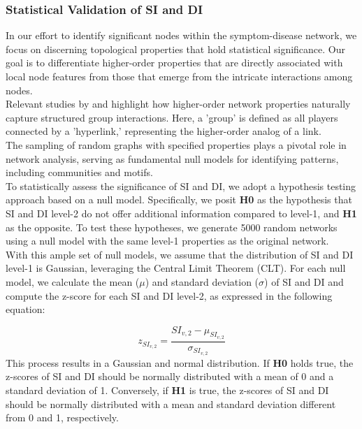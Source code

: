\subsubsection*{Statistical Validation of SI and DI}

In our effort to identify significant nodes within the symptom-disease network,
we focus on discerning topological properties that hold statistical significance.
Our goal is to differentiate higher-order properties that are directly associated with local node features from those
that emerge from the intricate interactions among nodes.\\
Relevant studies by \citeauthor{Squartini_2011_a} \cite{Squartini_2011_a, Squartini_2011_b} and \citeauthor{Spelta_2023} \cite{Spelta_2023}
highlight how higher-order network properties naturally capture structured group interactions.
Here, a 'group' is defined as all players connected by a 'hyperlink,' representing the higher-order analog of a link.\\
The sampling of random graphs with specified properties plays a pivotal role in network analysis,
serving as fundamental null models for identifying patterns, including communities and motifs.\\
To statistically assess the significance of SI and DI, we adopt a hypothesis testing approach based on a null model.
Specifically, we posit \textbf{H0} as the hypothesis that SI and DI level-2 do not offer additional information compared to level-1,
and \textbf{H1} as the opposite.
To test these hypotheses, we generate 5000 random networks using a null model with the same level-1 properties as the original network.\\
With this ample set of null models, we assume that the distribution of SI and DI level-1 is Gaussian, leveraging the Central Limit Theorem (CLT).
For each null model, we calculate the mean ($\mu$) and standard deviation ($\sigma$) of SI and DI and compute the z-score for each SI and DI level-2,
as expressed in the following equation:

\begin{equation}
    z_{SI_{v, 2}} = \frac{SI_{v, 2} - \mu_{SI_{v, 2}}}{\sigma_{SI_{v, 2}}}
\end{equation}
\noindent
This process results in a Gaussian and normal distribution. If \textbf{H0} holds true,
the z-scores of SI and DI should be normally distributed with a mean of 0 and a standard deviation of 1.
Conversely, if \textbf{H1} is true, the z-scores of SI and DI should be normally distributed with a mean and standard deviation different from 0 and 1,
respectively.


